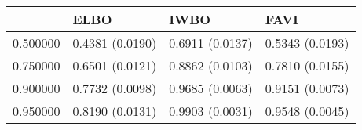 \begin{tabular}{llll}
\toprule
 & ELBO & IWBO & FAVI \\
\midrule
0.500000 & 0.4381 (0.0190) & 0.6911 (0.0137) & 0.5343 (0.0193) \\
0.750000 & 0.6501 (0.0121) & 0.8862 (0.0103) & 0.7810 (0.0155) \\
0.900000 & 0.7732 (0.0098) & 0.9685 (0.0063) & 0.9151 (0.0073) \\
0.950000 & 0.8190 (0.0131) & 0.9903 (0.0031) & 0.9548 (0.0045) \\
\bottomrule
\end{tabular}
